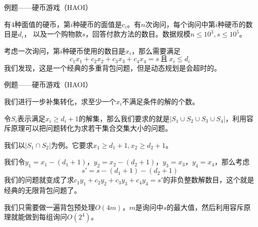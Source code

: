 \documentclass[allowframebreaks,9pt]{beamer}
\begin{document}
\begin{frame}{例题——硬币游戏（HAOI）}

\begin{problem}
有$4$种面值的硬币，第$i$种硬币的面值是$c_i$。有$n$次询问，每个询问中第$i$种硬币的数目是$d_i$，
以及一个购物款$s$，回答付款方法的数目。数据规模$n \le 10^3,s \le 10^5$。
\end{problem}

\pause

\begin{solution}
考虑一次询问，第$i$种硬币使用的数目是$x_i$，那么需要满足
\[
c_1x_1+c_2x_2+c_3x_3+c_4x_4=s\ \mbox{且}\ x_i \le d_i
\]
我们发现，这是一个经典的多重背包问题，但是动态规划是会超时的。
\end{solution}

\end{frame}

\begin{frame}{例题——硬币游戏（HAOI）}

\begin{solution}
我们进行一步{\color{red}补集转化}，求至少一个$x_i$不满足条件的解的个数。 \par
令$S_i$表示满足$x_i \ge d_i+1$的解集，那么我们要求的就是$|S_1 \cup S_2 \cup S_3 \cup S_4|$，利用容斥原理可以把问题转化为求若干集合交集大小的问题。
\end{solution}

\pause

\begin{solution}
我们以$|S_1 \cap S_2|$为例。它要求$x_1 \ge d_1 + 1, x_2 \ge d_2 + 1$。 \par
\pause
我们令$y_1=x_1-(d_1+1)$，$y_2=x_2-(d_2+1)$，$y_3=x_3$，$y_4=x_4$，那么考虑
\[
s'=s-(d_1+1)-(d_2+1)
\]
我们的问题就变成了求$c_1y_1+c_2y_2+c_3y_3+c_4y_4=s'$的非负整数解数目，这个就是经典的无限背包问题了。 \par
\pause
我们只需要做一遍背包预处理$O(4m)$，$m$是询问中$s$的最大值，然后利用容斥原理就能做到每组询问$O(2^4)$。
\end{solution}

\end{frame}
\end{document}
